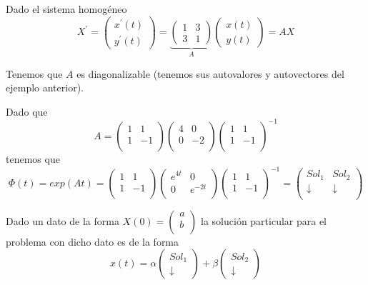 \documentclass{mathnotes}
\begin{document}
\begin{example}[(Método II)]
Dado el sistema homogéneo $$X^\prime = \begin{pmatrix}
x^\prime(t)\\y^\prime(t)
\end{pmatrix}
= \underbrace{\begin{pmatrix}
1 & 3\\3 & 1
\end{pmatrix}}_{A}\begin{pmatrix}
x(t)\\y(t)
\end{pmatrix} = AX$$

Tenemos que $A$ es diagonalizable (tenemos sus autovalores y autovectores del ejemplo anterior).

Dado que $$A = \begin{pmatrix}
1& 1\\1 & -1\\
\end{pmatrix}\begin{pmatrix}
4& 0\\0& -2\\
\end{pmatrix}\begin{pmatrix}
1& 1\\1 & -1\\
\end{pmatrix}^{-1}$$
tenemos que $$\Phi(t) = exp(At) = \begin{pmatrix}
1& 1\\1 & -1\\
\end{pmatrix}\begin{pmatrix}
e^{4t}& 0\\0& e^{-2t}\\
\end{pmatrix}\begin{pmatrix}
1& 1\\1 & -1\\
\end{pmatrix}^{-1} = \begin{pmatrix}

Sol_1 & Sol_2\\ \downarrow & \downarrow\\
\end{pmatrix}$$

Dado un dato de la forma $X(0) = \begin{pmatrix}
a\\b\\
\end{pmatrix}$ la solución particular para el problema con dicho dato es de la forma $$x(t) = \alpha\begin{pmatrix}
Sol_1\\\downarrow
\end{pmatrix} + \beta\begin{pmatrix}
Sol_2\\\downarrow
\end{pmatrix}$$


\end{example}
\end{document}

